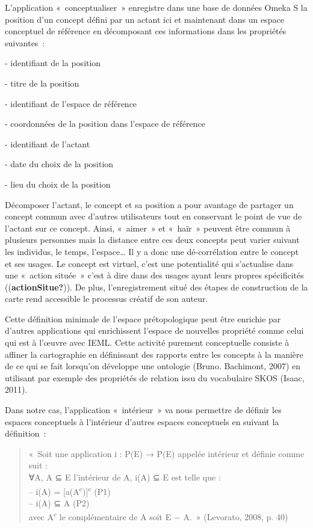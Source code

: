 \documentclass[
  a4paper,
  DIV=11,
  numbers=noendperiod]{scrreprt}
\begin{document}
L'application «~conceptualiser~» enregistre dans une base de données
Omeka S la position d'un concept défini par un actant ici et maintenant
dans un espace conceptuel de référence en décomposant ces informations
dans les propriétés suivantes~:

- identifiant de la position

- titre de la position

- identifiant de l'espace de référence

- coordonnées de la position dans l'espace de référence

- identifiant de l'actant

- date du choix de la position

- lieu du choix de la position

Décomposer l'actant, le concept et sa position a pour avantage de
partager un concept commun avec d'autres utilisateurs tout en conservant
le point de vue de l'actant sur ce concept. Ainsi, «~aimer~» et «~haïr~»
peuvent être commun à plusieurs personnes mais la distance entre ces
deux concepts peut varier suivant les individus, le temps,
l'espace\ldots{} Il y a donc une dé-corrélation entre le concept et ses
usages. Le concept est virtuel, c'est une potentialité qui s'actualise
dans une «~action située~» c'est à dire dans des usages ayant leurs
propres spécificités ((\textbf{actionSitue?})). De plus,
l'enregistrement situé des étapes de construction de la carte rend
accessible le processus créatif de son auteur.

Cette définition minimale de l'espace prétopologique peut être enrichie
par d'autres applications qui enrichissent l'espace de nouvelles
propriété comme celui qui est à l'œuvre avec IEML. Cette activité
purement conceptuelle consiste à affiner la cartographie en définissant
des rapports entre les concepts à la manière de ce qui se fait lorsqu'on
développe une ontologie (Bruno. Bachimont, 2007) en utilisant par
exemple des propriétés de relation issu du vocabulaire SKOS (Isaac,
2011).

Dans notre cas, l'application «~intérieur~» va nous permettre de définir
les espaces conceptuels à l'intérieur d'autres espaces conceptuels en
suivant la définition~:

\begin{quote}
«~Soit une application i : P(E) → P(E) appelée intérieur et définie
comme suit :\\
∀A, A ⊆ E l'intérieur de A, i(A) ⊆ E est telle que :\\
-- i(A) = {[}a(A\textsuperscript{c}){]}\textsuperscript{c} (P1)\\
-- i(A) ⊆ A (P2)\\
avec A\textsuperscript{c} le complémentaire de A soit E − A.~»
(Levorato, 2008, p. 40)
\end{quote}
\end{document}
